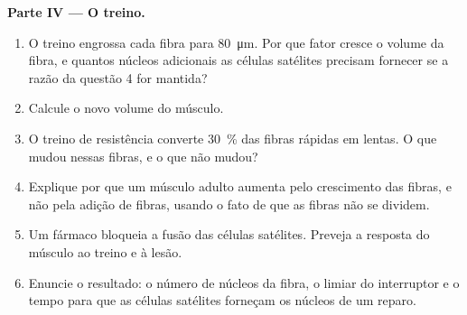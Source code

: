 \begin{problem}
\medskip
\noindent\textbf{Parte IV --- O treino.}
\begin{enumerate}[resume]
  \item O treino engrossa cada fibra para \qty{80}{\micro m}. Por que
        fator cresce o volume da fibra, e quantos núcleos adicionais as
        células satélites precisam fornecer se a razão da questão 4 for
        mantida?
  \item Calcule o novo volume do músculo.
  \item O treino de resistência converte \qty{30}{\%} das fibras
        rápidas em lentas. O que mudou nessas fibras, e o que não mudou?
  \item Explique por que um músculo adulto aumenta pelo crescimento das
        fibras, e não pela adição de fibras, usando o fato de que as
        fibras não se dividem.
  \item Um fármaco bloqueia a fusão das células satélites. Preveja a
        resposta do músculo ao treino e à lesão.
  \item Enuncie o resultado: o número de núcleos da fibra, o limiar do
        interruptor e o tempo para que as células satélites forneçam os
        núcleos de um reparo.
\end{enumerate}
\end{problem}
